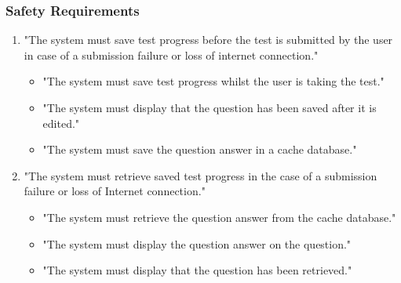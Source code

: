 \documentclass[12pt,a4paper]{article}
\begin{document}
		\subsubsection*{Safety Requirements}
			\begin{enumerate}
				\item  "The system must save test progress before the test is submitted by the user in case of a submission failure or loss of internet connection." 
				\begin{itemize}
					\item  "The system must save test progress whilst the user is taking the test."
					\item "The system must display that the question has been saved after it is edited."
					\item "The system must save the question answer in a cache database."
				\end{itemize}
				\item  "The system must retrieve saved test progress in the case of a submission failure or loss of Internet connection."
				\begin{itemize}
					\item  "The system must retrieve the question answer from the cache database."
					\item "The system must display the question answer on the question."
					\item  "The system must display that the question has been retrieved."
				\end{itemize}
			\end{enumerate}
\end{document}
